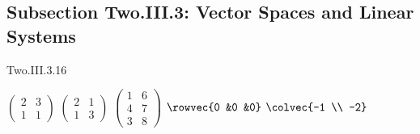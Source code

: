\subsection{Subsection Two.III.3: Vector Spaces and Linear Systems}
\begin{ans}{Two.III.3.16}
      \begin{exparts*}
        \partsitem \( \begin{pmatrix}
                   2  &3  \\
                   1  &1
                 \end{pmatrix}  \)
        \partsitem \( \begin{pmatrix}
                   2  &1  \\
                   1  &3
                 \end{pmatrix}  \)
        \partsitem \( \begin{pmatrix}
                   1  &6  \\
                   4  &7  \\
                   3  &8
                 \end{pmatrix}  \)
        \partsitem \( \rowvec{0 &0 &0} \)
        \partsitem \( \colvec{-1 \\ -2} \)
      \end{exparts*}
    
\end{ans}
